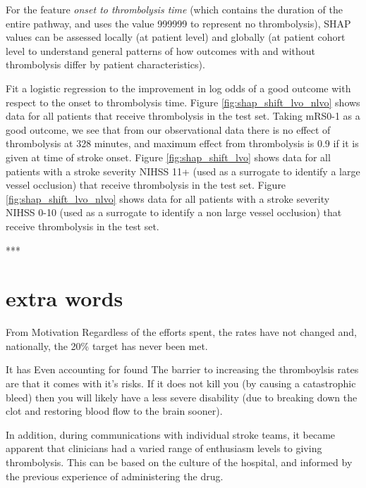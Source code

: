 For the feature \textit{onset to thrombolysis time} (which contains the duration of the entire pathway, and uses the value 999999 to represent no thrombolysis), 
SHAP values can be assessed locally (at patient level) and globally (at patient cohort level to understand general patterns of how outcomes with and without thrombolysis differ by patient characteristics).



Fit a logistic regression to the improvement in log odds of a good outcome with respect to the onset to thrombolysis time. Figure \ref{fig:shap_shift_lvo_nlvo} shows data for all patients that receive thrombolysis in the test set. Taking mRS0-1 as a good outcome, we see that from our observational data there is no effect of thrombolysis at 328 minutes, and maximum effect from thrombolysis is 0.9 if it is given at time of stroke onset. Figure \ref{fig:shap_shift_lvo} shows data for all patients with a stroke severity NIHSS 11+ (used as a surrogate to identify a large vessel occlusion) that receive thrombolysis in the test set. Figure \ref{fig:shap_shift_lvo_nlvo} shows data for all patients with a stroke severity NIHSS 0-10 (used as a surrogate to identify a non large vessel occlusion) that receive thrombolysis in the test set.


***









\section{extra words}

From Motivation
Regardless of the efforts spent, the rates have not changed and, nationally, the 20\% target has never been met. 

It has Even accounting for  found The barrier to increasing the thromboylsis rates are that it comes with it's risks. If it does not kill you (by causing a catastrophic bleed) then you will likely have a less severe disability (due to breaking down the clot and restoring blood flow to the brain sooner).

In addition, during communications with individual stroke teams, it became apparent that clinicians had a varied range of enthusiasm levels to giving thrombolysis. This can be based on the culture of the hospital, and informed by the previous experience of administering the drug.

